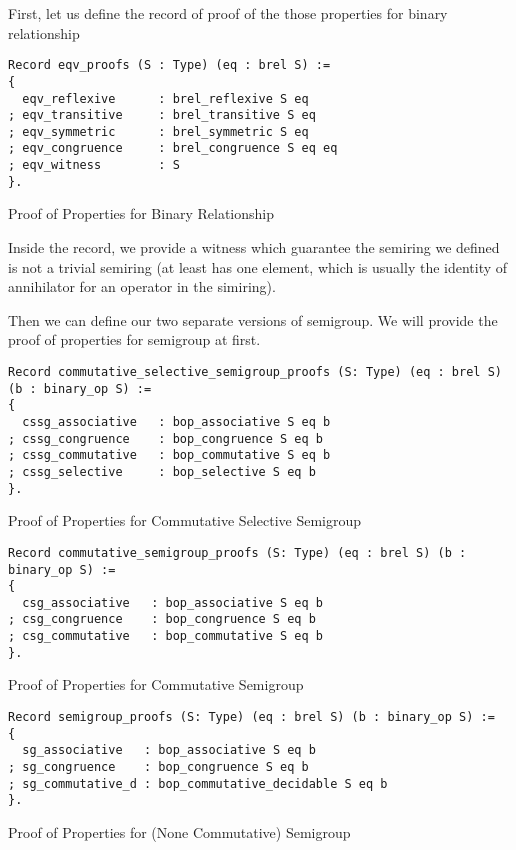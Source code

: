 First, let us define the record of proof of the those properties for binary relationship
\begin{listing}[H]
\begin{verbatim}
Record eqv_proofs (S : Type) (eq : brel S) :=
{
  eqv_reflexive      : brel_reflexive S eq            
; eqv_transitive     : brel_transitive S eq           
; eqv_symmetric      : brel_symmetric S eq
; eqv_congruence     : brel_congruence S eq eq                                      
; eqv_witness        : S                                      
}.
\end{verbatim}
\caption{Proof of Properties for Binary Relationship} 
\label{coq:def:eqv_proofs}
\end{listing}
Inside the record, we provide a witness which guarantee the semiring we defined is not a trivial semiring (at least has one element, which is usually the identity of annihilator for an operator in the simiring).

Then we can define our two separate versions of semigroup. We will provide the proof of properties for semigroup at first.
\begin{listing}[H]
\begin{verbatim}
Record commutative_selective_semigroup_proofs (S: Type) (eq : brel S) (b : binary_op S) := 
{
  cssg_associative   : bop_associative S eq b
; cssg_congruence    : bop_congruence S eq b
; cssg_commutative   : bop_commutative S eq b
; cssg_selective     : bop_selective S eq b                                                                            
}.
\end{verbatim}
\caption{Proof of Properties for Commutative Selective Semigroup} 
\label{coq:def:commutative_selective_semigroup_proofs}
\end{listing}

\begin{listing}[H]
\begin{verbatim}
Record commutative_semigroup_proofs (S: Type) (eq : brel S) (b : binary_op S) := 
{
  csg_associative   : bop_associative S eq b
; csg_congruence    : bop_congruence S eq b
; csg_commutative   : bop_commutative S eq b                                      
}.
\end{verbatim}
\caption{Proof of Properties for Commutative Semigroup} 
\label{coq:def:commutative_semigroup_proofs}
\end{listing}

\begin{listing}[H]
\begin{verbatim}
Record semigroup_proofs (S: Type) (eq : brel S) (b : binary_op S) := 
{
  sg_associative   : bop_associative S eq b
; sg_congruence    : bop_congruence S eq b
; sg_commutative_d : bop_commutative_decidable S eq b                                      
}.
\end{verbatim}
\caption{Proof of Properties for (None Commutative) Semigroup} 
\label{coq:def:semigroup_proofs}
\end{listing}

